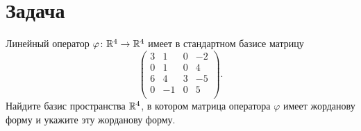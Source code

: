 \documentclass[a4paper]{article}
\theoremstyle{remark}
\begin{document}
    \section*{Задача }
        Линейный оператор $\varphi \colon \mathbb{R}^4 \to \mathbb{R}^4$ имеет в стандартном базисе матрицу
        $$
        \begin{pmatrix}
            3 & 1 & 0 & -2 \\
            0 & 1 & 0 & 4 \\
            6 & 4 & 3 & -5 \\
            0 & -1 & 0 & 5 \\
        \end{pmatrix}.
        $$
        Найдите базис пространства $\mathbb{R}^4$, в котором матрица оператора $\varphi$ 
        имеет жорданову форму и укажите эту жорданову форму.
\end{document}

